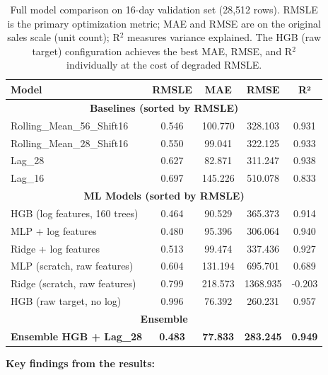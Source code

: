 \begin{table}[H]
\centering{}
\begin{tabular}{l c c c c}
\toprule\rowcolor{tablehead!80}\color{white}\textbf{Model} &\color{white}\textbf{RMSLE} &\color{white}\textbf{MAE} &\color{white}\textbf{RMSE} &\color{white}\textbf{R²}\\
\midrule
\multicolumn{5}{c}{\textbf{Baselines (sorted by RMSLE)}}\\
\midrule
Rolling\_Mean\_56\_Shift16 & 0.546 & 100.770 & 328.103 & 0.931\\
Rolling\_Mean\_28\_Shift16 & 0.550 & 99.041 & 322.125 & 0.933\\
Lag\_28 & 0.627 & 82.871 & 311.247 & 0.938\\
Lag\_16 & 0.697 & 145.226 & 510.078 & 0.833\\
\midrule
\multicolumn{5}{c}{\textbf{ML Models (sorted by RMSLE)}}\\
\midrule
HGB (log features, 160 trees) & 0.464 & 90.529 & 365.373 & 0.914\\
MLP + log features & 0.480 & 95.396 & 306.064 & 0.940\\
Ridge + log features & 0.513 & 99.474 & 337.436 & 0.927\\
MLP (scratch, raw features) & 0.604 & 131.194 & 695.701 & 0.689\\
Ridge (scratch, raw features) & 0.799 & 218.573 & 1368.935 & -0.203\\
HGB (raw target, no log) & 0.996 & 76.392 & 260.231 & 0.957\\
\midrule
\multicolumn{5}{c}{\textbf{Ensemble}}\\
\midrule
\rowcolor{greenaccent!15}\textbf{Ensemble HGB + Lag\_28} & \textbf{0.483} & \textbf{77.833} & \textbf{283.245} & \textbf{0.949}\\
\bottomrule
\end{tabular}
\caption{Full model comparison on 16-day validation set (28,512 rows). RMSLE is the primary optimization metric; MAE and RMSE are on the original sales scale (unit count); R$^2$ measures variance explained. The HGB (raw target) configuration achieves the best MAE, RMSE, and R$^2$ individually at the cost of degraded RMSLE.}
\end{table}

\textbf{Key findings from the results:}


